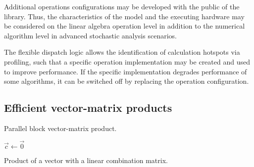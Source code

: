 Additional operations configurations may be developed with the public
 of the library. Thus, the characteristics of the model
and the executing hardware may be considered on the linear algebra
operation level in addition to the numerical algorithm level in
advanced stochastic analysis scenarios.

The flexible dispatch logic allows the identification of calculation
hotspots via profiling, such that a specific operation implementation
may be created and used to improve performance. If the specific
implementation degrades performance of some algorithms, it can be
switched off by replacing the operation configuration.

\subsection{Efficient vector-matrix products}
\label{sec:algorithms:vector-matrix}

\begin{algorithm}
  \;
  \caption{Parallel block vector-matrix product.}
  \label{alg:algorithms:matmul:block}
\end{algorithm}

\begin{algorithm}
  $\vec{c} \gets \vec{0}$
  \;
  \caption{Product of a vector with a linear combination matrix.}
  \label{alg:algorithms:matmul:lincomb}
\end{algorithm}

